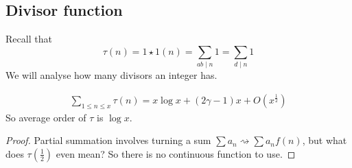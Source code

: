 \documentclass{article}
\begin{document}
\subsection{Divisor function}
Recall that
\begin{equation*}\tau(n) = 1 \star 1 (n) = \sum_{ab \mid n} 1 = \sum_{d \mid n} 1\end{equation*}
We will analyse how many divisors an integer has.
\begin{nthm}\label{thm:4}
  \begin{align*}
    \sum_{1 \leq n \leq x} \tau(n) = x \log x + (2 \gamma - 1) x + O(x^{\frac{1}{2}})
  \end{align*}
  So average order of $\tau$ is $\log x$.
\end{nthm}
\begin{proof}
  Partial summation involves turning a sum $\sum a_n \rightsquigarrow \sum a_n f(n)$, but what does $\tau(\frac{1}{2})$ even mean?
  So there is no continuous function to use.


\end{proof}
\end{document}
